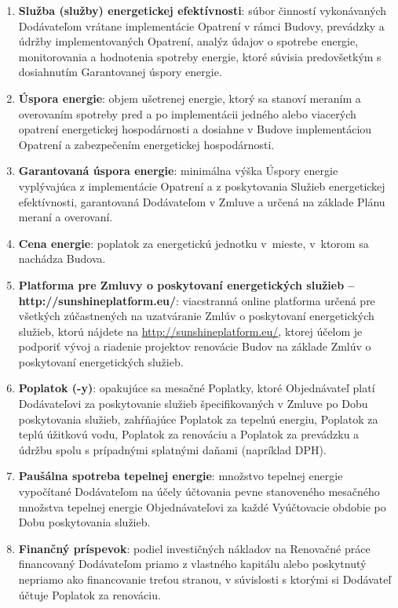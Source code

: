 \begin{multicols}{2}
\begin{enumerate}
\item\textbf{Služba (služby) energetickej efektívnosti}: súbor činností
vykonávaných Dodávateľom vrátane implementácie Opatrení v rámci Budovy,
prevádzky a údržby implementovaných Opatrení, analýz údajov o spotrebe
energie, monitorovania a hodnotenia spotreby energie, ktoré súvisia
predovšetkým s dosiahnutím Garantovanej úspory energie.

\item\textbf{Úspora energie}: objem ušetrenej energie, ktorý sa stanoví
meraním a overovaním spotreby pred a po implementácii jedného alebo
viacerých opatrení energetickej hospodárnosti a dosiahne v Budove
implementáciou Opatrení a zabezpečením energetickej hospodárnosti.

\item\textbf{Garantovaná úspora energie}: minimálna výška Úspory energie
vyplývajúca z implementácie Opatrení a z poskytovania Služieb
energetickej efektívnosti, garantovaná Dodávateľom v Zmluve a určená na
základe Plánu meraní a overovaní.

\item\textbf{Cena energie}: poplatok za energetickú jednotku v~mieste,
v~ktorom sa nachádza Budova.

\item\textbf{Platforma pre Zmluvy o poskytovaní energetických služieb
--http://sunshineplatform.eu/}: viacstranná online platforma určená pre
všetkých zúčastnených na uzatváranie Zmlúv o poskytovaní energetických
služieb, ktorú nájdete na
\href{http://www.sharex.lv}{http://sunshineplatform.eu/}, ktorej účelom
je podporiť vývoj a riadenie projektov renovácie Budov na základe Zmlúv
o poskytovaní energetických služieb.

\item\textbf{Poplatok (-y)}: opakujúce sa mesačné Poplatky, ktoré
Objednávateľ platí Dodávateľovi za poskytovanie služieb špecifikovaných
v Zmluve po Dobu poskytovania služieb, zahŕňajúce Poplatok za tepelnú
energiu, Poplatok za teplú úžitkovú vodu, Poplatok za renováciu a
Poplatok za prevádzku a údržbu spolu s prípadnými splatnými daňami
(napríklad DPH).

\item\textbf{Paušálna spotreba tepelnej energie}: množstvo tepelnej energie
vypočítané Dodávateľom na účely účtovania pevne stanoveného mesačného
množstva tepelnej energie Objednávateľovi za každé Vyúčtovacie obdobie
po Dobu poskytovania služieb.

\item\textbf{Finančný príspevok}: podiel investičných nákladov na Renovačné
práce financovaný Dodávateľom priamo z vlastného kapitálu alebo
poskytnutý nepriamo ako financovanie treťou stranou, v súvislosti s
ktorými si Dodávateľ účtuje Poplatok za renováciu.


\end{enumerate}
\end{multicols}
